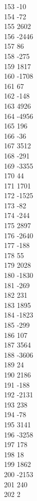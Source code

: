 { 153	-10 \\
 154	-72 \\
 155	2602 \\
 156	-2446 \\
 157	86 \\
 158	-275 \\
 159	1817 \\
 160	-1708 \\
 161	67 \\
 162	-148 \\
 163	4926 \\
 164	-4956 \\
 165	196 \\
 166	-36 \\
 167	3512 \\
 168	-291 \\
 169	-3355 \\
 170	44 \\
 171	1701 \\
 172	-1525 \\
 173	-82 \\
 174	-244 \\
 175	2897 \\
 176	-2640 \\
 177	-188 \\
 178	55 \\
 179	2028 \\
 180	-1830 \\
 181	-269 \\
 182	231 \\
 183	1895 \\
 184	-1823 \\
 185	-299 \\
 186	107 \\
 187	3564 \\
 188	-3606 \\
 189	24 \\
 190	2186 \\
 191	-188 \\
 192	-2131 \\
 193	238 \\
 194	-78 \\
 195	3141 \\
 196	-3258 \\
 197	178 \\
 198	18 \\
 199	1862 \\
 200	-2153 \\
 201	240 \\
 202	2 \\
}
